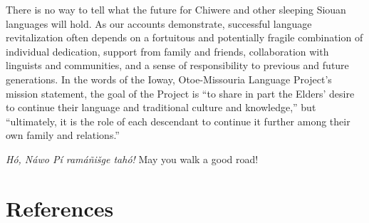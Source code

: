 \documentclass[output=paper]{LSP/langsci}
\begin{document}
There is no way to tell what the future for Chiwere and other sleeping Siouan languages will hold. As our accounts demonstrate, successful language revitalization often depends on a fortuitous and potentially fragile combination of individual dedication, support from family and friends, collaboration with linguists and communities, and a sense of responsibility to previous and future generations. In the words of the Ioway, Otoe-Missouria Language Project's mission statement, the goal of the Project is ``to share in part the Elders' desire to continue their language and traditional culture and knowledge,'' but ``ultimately, it is the role of each descendant to continue it further among their own family and relations.''

\emph{H\'o, N\'awo P\'i ram\'a\~ni\v{s}ge tah\'o!}  May you walk a good road!

\section*{References}

\newenvironment{reflist} {\begin{list} {} {\listparindent -.25in
\leftmargin .3in} \item \ \vspace{-.3in} } {\end{list} }
\end{document}
